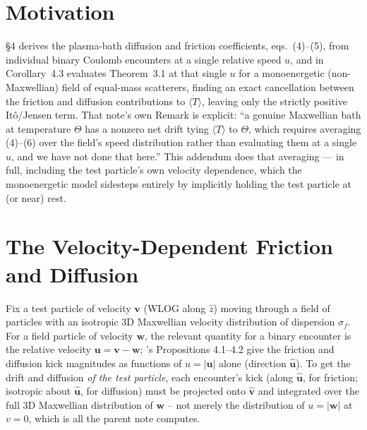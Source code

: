 \documentclass[12pt]{amsart}
\theoremstyle{plain}
\theoremstyle{remark}
\begin{document}
\section{Motivation}

\cite{EbertBath2026} \S4 derives the plasma-bath diffusion and friction coefficients, eqs.\ (4)--(5), from individual binary Coulomb encounters at a single relative speed $u$, and in Corollary~4.3 evaluates Theorem~3.1 at that single $u$ for a monoenergetic (non-Maxwellian) field of equal-mass scatterers, finding an exact cancellation between the friction and diffusion contributions to $\langle\dot T\rangle$, leaving only the strictly positive It\^o/Jensen term. That note's own Remark is explicit: ``a genuine Maxwellian bath at temperature $\Theta$ has a nonzero net drift tying $\langle T\rangle$ to $\Theta$, which requires averaging (4)--(6) over the field's speed distribution rather than evaluating them at a single $u$, and we have not done that here.'' This addendum does that averaging --- in full, including the test particle's own velocity dependence, which the monoenergetic model sidesteps entirely by implicitly holding the test particle at (or near) rest.

\section{The Velocity-Dependent Friction and Diffusion}

Fix a test particle of velocity $\mathbf v$ (WLOG along $\hat z$) moving through a field of particles with an isotropic 3D Maxwellian velocity distribution of dispersion $\sigma_f$. For a field particle of velocity $\mathbf w$, the relevant quantity for a binary encounter is the relative velocity $\mathbf u=\mathbf v-\mathbf w$; \cite{EbertBath2026}'s Propositions 4.1--4.2 give the friction and diffusion kick magnitudes as functions of $u=|\mathbf u|$ alone (direction $\hat{\mathbf u}$). To get the drift and diffusion \emph{of the test particle}, each encounter's kick (along $\hat{\mathbf u}$, for friction; isotropic about $\hat{\mathbf u}$, for diffusion) must be projected onto $\hat{\mathbf v}$ and integrated over the full 3D Maxwellian distribution of $\mathbf w$ -- not merely the distribution of $u=|\mathbf w|$ at $v=0$, which is all the parent note computes.
\end{document}

